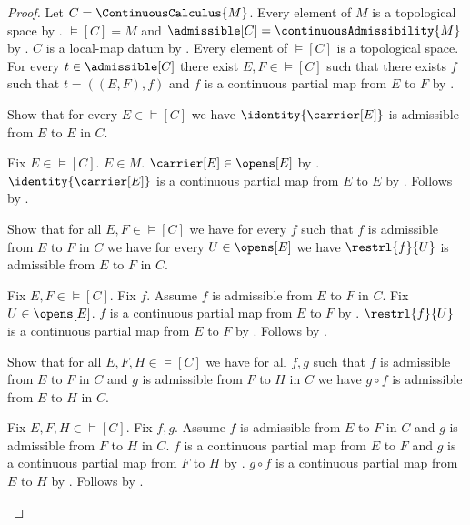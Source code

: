 \begin{proof}
    Let $C=\ContinuousCalculus{M}$.
    Every element of $M$ is a topological space by .
    $\models[C]=M$ and $\admissible[C]=\continuousAdmissibility{M}$ by
        .
    $C$ is a local-map datum by
        .
    Every element of $\models[C]$ is a topological space.
    For every $t\in\admissible[C]$ there exist $E,F\in\models[C]$ such that
        there exists $f$ such that $t=((E,F),f)$ and
            $f$ is a continuous partial map from $E$ to $F$ by
        .

    Show that for every $E\in\models[C]$ we have
        $\identity{\carrier[E]}$ is admissible from $E$ to $E$ in $C$.
    \begin{subproof}
        Fix $E\in\models[C]$.
        $E\in M$.
        $\carrier[E]\in\opens[E]$ by .
        $\identity{\carrier[E]}$ is a continuous partial map from $E$ to $E$ by
            .
        Follows by .
    \end{subproof}

    Show that for all $E,F\in\models[C]$ we have for every $f$ such that
        $f$ is admissible from $E$ to $F$ in $C$ we have
        for every $U\in\opens[E]$ we have
            $\restrl{f}{U}$ is admissible from $E$ to $F$ in $C$.
    \begin{subproof}
        Fix $E,F\in\models[C]$.
        Fix $f$.
        Assume $f$ is admissible from $E$ to $F$ in $C$.
        Fix $U\in\opens[E]$.
        $f$ is a continuous partial map from $E$ to $F$ by
            .
        $\restrl{f}{U}$ is a continuous partial map from $E$ to $F$ by
            .
        Follows by .
    \end{subproof}

    Show that for all $E,F,H\in\models[C]$ we have for all $f,g$ such that
        $f$ is admissible from $E$ to $F$ in $C$ and
        $g$ is admissible from $F$ to $H$ in $C$ we have
        $g\circ f$ is admissible from $E$ to $H$ in $C$.
    \begin{subproof}
        Fix $E,F,H\in\models[C]$.
        Fix $f,g$.
        Assume $f$ is admissible from $E$ to $F$ in $C$ and
            $g$ is admissible from $F$ to $H$ in $C$.
        $f$ is a continuous partial map from $E$ to $F$ and
            $g$ is a continuous partial map from $F$ to $H$ by
            .
        $g\circ f$ is a continuous partial map from $E$ to $H$ by
            .
        Follows by .
    \end{subproof}


\end{proof}
